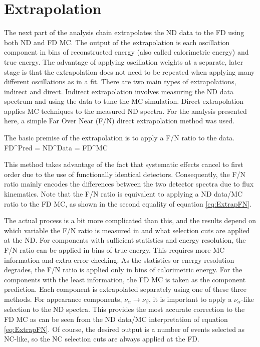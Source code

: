 \section{Extrapolation}
\label{sec:AnaExtrap}

The next part of the analysis chain extrapolates the ND data to the FD using both ND and FD MC. The output of the extrapolation is each oscillation component in bins of reconstructed energy (also called calorimetric energy) and true energy. The advantage of applying oscillation weights at a separate, later stage is that the extrapolation does not need to be repeated when applying many different oscillations as in a fit. There are two main types of extrapolations, indirect and direct. Indirect extrapolation involves measuring the ND data spectrum and using the data to tune the MC simulation. Direct extrapolation applies MC techniques to the measured ND spectra. For the analysis presented here, a simple Far Over Near (F/N) direct extrapolation method was used. 

The basic premise of the extrapolation is to apply a F/N ratio to the data.
\beq
\mbox{FD}^{Pred} = \mbox{ND}^{Data}  = \mbox{FD}^{MC} 
\label{eq:ExtrapFN}
\eeq

\n This method takes advantage of the fact that systematic effects cancel to first order due to the use of functionally identical detectors. Consequently, the F/N ratio mainly encodes the differences between the two detector spectra due to flux kinematics. Note that the F/N ratio is equivalent to applying a ND data/MC ratio to the FD MC, as shown in the second equality of equation \ref{eq:ExtrapFN}.

The actual process is a bit more complicated than this, and the results depend on which variable the F/N ratio is measured in and what selection cuts are applied at the ND. For components with sufficient statistics and energy resolution, the F/N ratio can be applied in bins of true energy. This requires more MC information and extra error checking. As the statistics or energy resolution degrades, the F/N ratio is applied only in bins of calorimetric energy. For the components with the least information, the FD MC is taken as the component prediction. Each component is extrapolated separately using one of these three methods. For appearance components, $\nu_\alpha \rightarrow \nu_\beta$, it is important to apply a $\nu_\alpha$-like selection to the ND spectra. This provides the most accurate correction to the FD MC as can be seen from the ND data/MC interpretation of equation \ref{eq:ExtrapFN}. Of course, the desired output is a number of events selected as NC-like, so the NC selection cuts are always applied at the FD.

